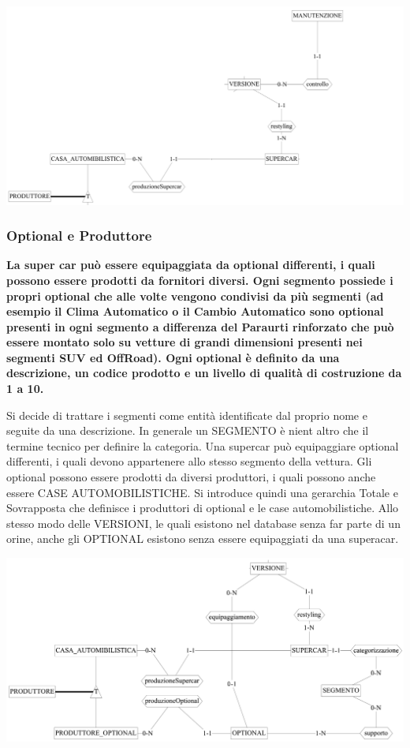 \documentclass[11pt]{article}
\begin{document}
\begin{center}
    \includegraphics[width=\linewidth]{images/partialSchemes/versione.png}
\end{center}

\subsubsection{Optional e Produttore}
\textbf{La super car può essere equipaggiata da optional differenti, i quali
possono essere prodotti da fornitori diversi. Ogni segmento possiede i propri
optional che alle volte vengono condivisi da più segmenti (ad esempio il Clima
Automatico o il Cambio Automatico sono optional presenti in ogni segmento a
differenza del Paraurti rinforzato che può essere montato solo su vetture di
grandi dimensioni presenti nei segmenti SUV ed OffRoad). Ogni optional è
definito da una descrizione, un codice prodotto e un livello di qualità di
costruzione da 1 a 10.}

Si decide di trattare i segmenti come entità identificate dal proprio nome e
seguite da una descrizione. In generale un SEGMENTO è nient altro che il termine
tecnico per definire la categoria. Una supercar può equipaggiare optional
differenti, i quali devono appartenere allo stesso segmento della vettura. Gli
optional possono essere prodotti da diversi produttori, i quali possono anche
essere CASE AUTOMOBILISTICHE. Si introduce quindi una gerarchia Totale e
Sovrapposta che definisce i produttori di optional e le case automobilistiche.
Allo stesso modo delle VERSIONI, le quali esistono nel database senza far parte
di un orine, anche gli OPTIONAL esistono senza essere equipaggiati da una superacar.

\begin{center}
    \includegraphics[width=\linewidth]{images/partialSchemes/optional.png}
\end{center}
\end{document}

